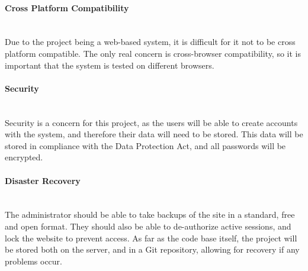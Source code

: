 \paragraph{Cross Platform Compatibility}\ \\
Due to the project being a web-based system, it is difficult for it not to be cross platform compatible. The only real concern is cross-browser compatibility, so it is important that the system is tested on different browsers.

\paragraph{Security}\ \\
Security is a concern for this project, as the users will be able to create accounts with the system, and therefore their data will need to be stored. This data will be stored in compliance with the Data Protection Act, and all passwords will be encrypted. 

\paragraph{Disaster Recovery}\ \\
The administrator should be able to take backups of the site in a standard, free and open format. They should also be able to de-authorize active sessions, and lock the website to prevent access. As far as the code base itself, the project will be stored both on the server, and in a Git repository, allowing for recovery if any problems occur.